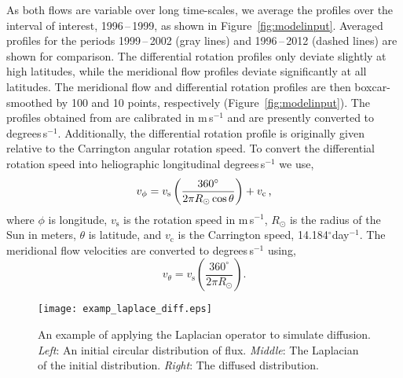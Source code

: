 As both flows are variable over long time-scales, we average the profiles over the interval of interest, 1996\,--\,1999, as shown in Figure~\ref{fig:modelinput}. Averaged profiles for the periods 1999\,--\,2002 (gray lines) and 1996\,--\,2012 (dashed lines) are shown for comparison. The differential rotation profiles only deviate slightly at high latitudes, while the meridional flow profiles deviate significantly at all latitudes. The meridional flow and differential rotation profiles are then boxcar-smoothed by 100 and 10 points, respectively (Figure~\ref{fig:modelinput}). The profiles obtained from \cite{Hathaway:2011} are calibrated in m\,s$^{-1}$ and are presently converted to degrees\,s$^{-1}$. Additionally, the differential rotation profile is originally given relative to the Carrington angular rotation speed. To convert the differential rotation speed into heliographic longitudinal degrees\,s$^{-1}$ we use,
\begin{equation}\label{eqn:convdiffrotdeg}
v_{\phi}=v_\mathrm{s} \left( \frac{360^{\circ}}{2 \pi R_{\odot} \cos{\theta}} \right) + v_{\mathrm{c}} \mbox{\,,}
\end{equation}
where $\phi$ is longitude, $v_\mathrm{s}$ is the rotation speed in m\,s$^{-1}$, $R_{\odot}$ is the radius of the Sun in meters, $\theta$ is latitude, and $v_{\mathrm{c}}$ is the Carrington speed, 14.184$^\circ$day$^{-1}$. The meridional flow velocities are converted to degrees\,s$^{-1}$ using,
\begin{equation}\label{eqn:convmeriddeg}
v_{\theta}=v_\mathrm{s} \left( \frac{360^{\circ}}{2 \pi R_{\odot}} \right) \mbox{.}
\end{equation}

\begin{table}
\caption[The elements of the discrete Laplacian operator kernel.]{The elements of the discrete Laplacian operator kernel. A 3$\times$3 array, with the values shown in the table, is convolved with an image to produce the discrete version of $\nabla^2$.}\label{table:lapker}
\end{table}

 \begin{figure}[!t]    %
   \centerline{\texttt{[image: examp\_laplace\_diff.eps]}
              }
              \caption[An example of applying the Laplacian operator to simulate diffusion.]{An example of applying the Laplacian operator to simulate diffusion. \emph{Left}: An initial circular distribution of flux. \emph{Middle}: The Laplacian of the initial distribution. \emph{Right}: The diffused distribution.}
   \label{fig:laplaceexamp}
   \end{figure}

